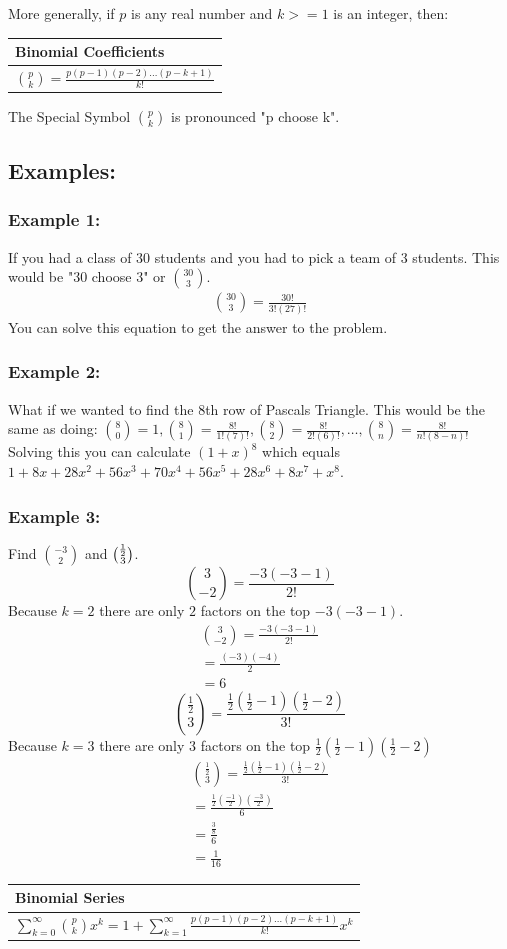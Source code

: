 \documentclass[12pt]{article}
\newcommand{\formula}[2]{
    {\renewcommand{\arraystretch}{2}
        \begin{center}
        \begin{tabular}{|p{0.9\textwidth}|}
        \hline
        \textbf{#1} \\
        \hline
        #2 \\
        \hline
        \end{tabular}
        \end{center}
    }
}
\begin{document}
\vspace{\baselineskip}

More generally, if $p$ is any real number and $k >= 1$ is an integer, then:

\formula{Binomial Coefficients}{$\binom{p}{k} = \frac{p(p-1)(p-2)\dotsc(p-k+1)}{k!}$}

The Special Symbol $\binom{p}{k}$ is pronounced "p choose k".

\subsection{Examples: }

\subsubsection{Example 1: }
If you had a class of 30 students and you had to pick a team of 3 students. This would be "30 choose 3" or $\binom{30}{3}$.
\begin{gather*}
\binom{30}{3} = \frac{30!}{3!(27)!}
\end{gather*}
You can solve this equation to get the answer to the problem.
\vspace{\baselineskip}

\subsubsection{Example 2: }
What if we wanted to find the 8th row of Pascals Triangle.
\vspace{\baselineskip}
This would be the same as doing: $\binom{8}{0} = 1, \binom{8}{1} = \frac{8!}{1!(7)!}, \binom{8}{2} = \frac{8!}{2!(6)!}, \dotsc, \binom{8}{n} = \frac{8!}{n!(8-n)!}$
\vspace{\baselineskip}
Solving this you can calculate $(1+x)^8$ which equals $1 + 8x + 28x^2 + 56x^3 + 70x^4 + 56x^5 + 28x^6 + 8x^7 + x^8$.
\vspace{\baselineskip}

\subsubsection{Example 3: }
Find $\binom{-3}{2}$ and $\tbinom{\frac{1}{2}}{3}$.
$$\binom{3}{-2} = \frac{-3(-3-1)}{2!}$$
Because $k=2$ there are only $2$ factors on the top $-3(-3-1)$.
\begin{gather*}
\binom{3}{-2} = \frac{-3(-3-1)}{2!} \\
= \frac{(-3)(-4)}{2} \\
= 6
\end{gather*}
$$\binom{\frac{1}{2}}{3} = \frac{\frac{1}{2} (\frac{1}{2} - 1) (\frac{1}{2} - 2)}{3!}$$
Because $k=3$ there are only $3$ factors on the top $\frac{1}{2} (\frac{1}{2} - 1) (\frac{1}{2} - 2)$
\begin{gather*}
\binom{\frac{1}{2}}{3} = \frac{\frac{1}{2} (\frac{1}{2} - 1) (\frac{1}{2} - 2)}{3!} \\
= \frac{\frac{1}{2} (\frac{-1}{2}) (\frac{-3}{2})}{6} \\
= \frac{\frac{3}{8}}{6} \\
= \frac{1}{16}
\end{gather*}

\formula{Binomial Series}{$\sum_{k=0}^{\infty} \binom{p}{k}x^k = 1 + \sum_{k=1}^{\infty} \frac{p(p-1)(p-2) \dotsc (p-k+1)}{k!}x^k$}
\end{document}
